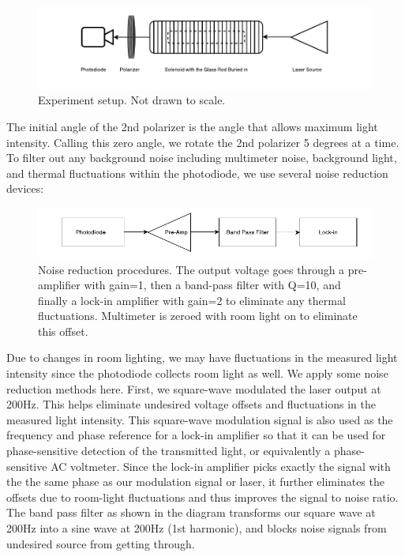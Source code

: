 \documentclass[prb,preprint]{revtex4-1}
\begin{document}
\begin{figure}[H]
    \centering
    \includegraphics[width=180mm]{ExperimentSetup.pdf}
    \caption{Experiment setup. Not drawn to scale. }
    \end{figure}
    
The initial angle of the 2nd polarizer is the angle that allows maximum light intensity. Calling this zero angle, we rotate the 2nd polarizer 5 degrees at a time. To filter out any background noise including multimeter noise, background light, and thermal fluctuations within the photodiode, we use several noise reduction devices:

\begin{figure}[H]
    \centering
    \includegraphics[width=180mm]{Filter.pdf}
    \caption{Noise reduction procedures. The output voltage goes through a pre-amplifier with gain=1, then a band-pass filter with Q=10, and finally a lock-in amplifier with gain=2 to eliminate any thermal fluctuations. Multimeter is zeroed with room light on to eliminate this offset.}
    \end{figure}
    
Due to changes in room lighting, we may have fluctuations in the measured light intensity since the photodiode collects room light as well. We apply some noise reduction methods here. First, we square-wave modulated the laser output at 200Hz. This helps eliminate undesired voltage offsets and fluctuations in the measured light intensity. This square-wave modulation signal is also used as the frequency and phase reference for a lock-in amplifier so that it can be used for phase-sensitive detection of the transmitted light, or equivalently a phase-sensitive AC voltmeter. Since the lock-in amplifier picks exactly the signal with the the same phase as our modulation signal or laser, it further eliminates the offsets due to room-light fluctuations and thus improves the signal to noise ratio.  The band pass filter as shown in the diagram transforms our square wave at 200Hz into a sine wave at 200Hz (1st harmonic), and blocks noise signals from undesired source from getting through.
\end{document}
